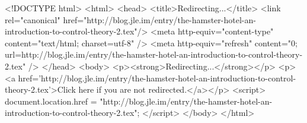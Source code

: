 <!DOCTYPE html>
<html>
<head>
<title>Redirecting...</title>
<link rel="canonical" href="http://blog.jle.im/entry/the-hamster-hotel-an-introduction-to-control-theory-2.tex"/>
<meta http-equiv="content-type" content="text/html; charset=utf-8" />
<meta http-equiv="refresh" content="0; url=http://blog.jle.im/entry/the-hamster-hotel-an-introduction-to-control-theory-2.tex" />
</head>
<body>
  <p><strong>Redirecting...</strong></p>
  <p><a href='http://blog.jle.im/entry/the-hamster-hotel-an-introduction-to-control-theory-2.tex'>Click here if you are not redirected.</a></p>
  <script>
    document.location.href = "http://blog.jle.im/entry/the-hamster-hotel-an-introduction-to-control-theory-2.tex";
  </script>
</body>
</html>

